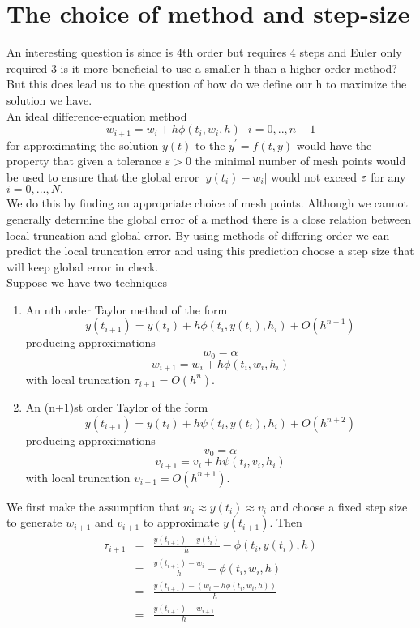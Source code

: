 \section{The choice of method and step-size}
An interesting question is since  is 4th order but requires 4 steps and Euler
only required 3 is it more beneficial to use a smaller h than a higher order method?\\
But this does lead us to the question of how do we define our h to maximize
the solution we have.\\
An ideal difference-equation method
\[w_{i+1}=w_i+h\phi(t_i,w_i,h) \ \ \ i=0,..,n-1 \]
for approximating the solution $y(t)$ to the 
$ y^{'} = f(t,y)$ would have the property that given a tolerance $\varepsilon >0$
the minimal number of mesh points would be used to ensure that the global error
$|y(t_i)-w_i|$ would not exceed $\varepsilon$ for any $i=0,...,N.$\\
We do this by finding an appropriate choice of mesh points. Although we cannot 
generally determine the global error of a method there is a close relation between 
local truncation and global error.  By using methods of differing order we can predict the local truncation error and using this prediction choose a step size
that will keep global error in check.\\
Suppose we have two techniques
\begin{enumerate}
\item
An nth order Taylor method of the form
\[y(t_{i+1}) = y(t_i) +h\phi(t_i,y(t_i),h_i)+O(h^{n+1}) \]
producing approximations
\[w_0=\alpha \]
\[w_{i+1}=w_i +h\phi(t_i,w_i,h_i)\]
with local truncation $\tau_{i+1}=O(h^n).$
\item
An (n+1)st order Taylor of the form
\[y(t_{i+1}) = y(t_i) +h\psi(t_i,y(t_i),h_i)+O(h^{n+2}) \]
producing approximations
\[v_0=\alpha \]
\[v_{i+1}=v_i +h\psi(t_i,v_i,h_i)\]
with local truncation $\upsilon_{i+1}=O(h^{n+1}).$
\end{enumerate}
We first make the assumption that $w_i \approx y(t_i) \approx v_i$ and choose a fixed
step size to generate $w_{i+1}$ and $v_{i+1}$ to approximate $y(t_{i+1})$.  Then
\begin{eqnarray*}
\tau_{i+1} & = & \frac{y(t_{i+1})-y(t_i)}{h} - \phi(t_i,y(t_i),h) \\
& = &  \frac{y(t_{i+1})-w_i}{h} - \phi(t_i,w_i,h) \\
& = &  \frac{y(t_{i+1})-(w_i+h\phi(t_i,w_i,h))}{h} \\
& = &  \frac{y(t_{i+1})-w_{i+1}}{h} 
\end{eqnarray*}
